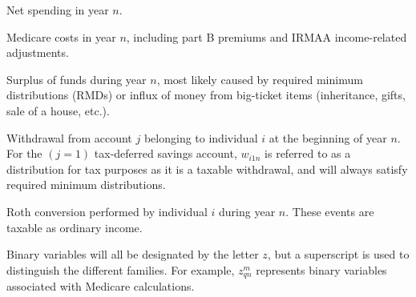 \documentclass{report}[fleqn,12pt]
\begin{document}
\begin{description}[leftmargin=4em,style=multiline]
\item [$g_n$]
	Net spending in year $n$.
\item [$m_n$]
	Medicare costs in year $n$, including part B premiums and IRMAA income-related adjustments.
\item [$s_{n}$]
	Surplus of funds during year $n$, most likely caused by required minimum distributions (RMDs)
	or influx of money from big-ticket items (inheritance, gifts, sale of a house, etc.).
\item [$w_{ijn}$]
	Withdrawal from account $j$ belonging to individual $i$ at the beginning of year $n$.
	For the $(j=1)$ tax-deferred savings account, $w_{i1n}$ is referred to as a distribution for
	tax purposes as it is a taxable withdrawal, and will always satisfy required minimum distributions.
\item [$x_{in}$]
	Roth conversion performed by individual $i$ during year $n$.
	These events are taxable as ordinary income.
\item [$z_{*}^*$]
	Binary variables will all be designated by the letter $z$, but a superscript is
	used to distinguish the different families. For example, $z_{qn}^m$ represents
	binary variables associated with Medicare calculations.
\end{description}
\end{document}
